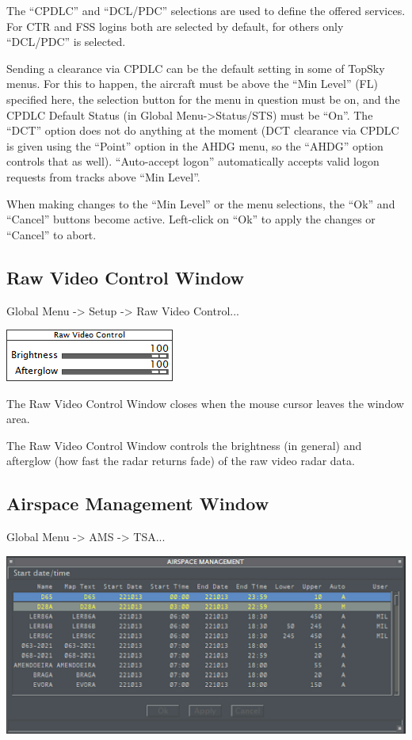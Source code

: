 \documentclass[11pt,a4paper,oldfontcommands]{memoir}
\begin{document}
The “CPDLC” and “DCL/PDC” selections are used to define the offered services. For CTR and FSS logins both are selected by default, for others only “DCL/PDC” is selected.

Sending a clearance via CPDLC can be the default setting in some of TopSky menus. For this to happen, the aircraft must be above the “Min Level” (FL) specified here, the selection button for the menu in question must be on, and the CPDLC Default Status (in Global Menu->Status/STS) must be “On”. The “DCT” option does not do anything at the moment (DCT clearance via CPDLC is given using the “Point” option in the AHDG menu, so the “AHDG” option controls that as well). “Auto-accept logon” automatically accepts valid logon requests from tracks above “Min Level”.

When making changes to the “Min Level” or the menu selections, the “Ok” and “Cancel” buttons become active. Left-click on “Ok” to apply the changes or “Cancel” to abort.

\subsection{Raw Video Control Window}
\label{win:rvcw}

Global Menu -> Setup -> Raw Video Control...

\includegraphics{img/rawvideo.png}

The Raw Video Control Window closes when the mouse cursor leaves the window area.

The Raw Video Control Window controls the brightness (in general) and afterglow (how fast the radar returns fade) of the raw video radar data.

\subsection{Airspace Management Window}
\label{win:amw}

Global Menu -> AMS -> TSA...

\includegraphics{img/tsa.png}
\end{document}
